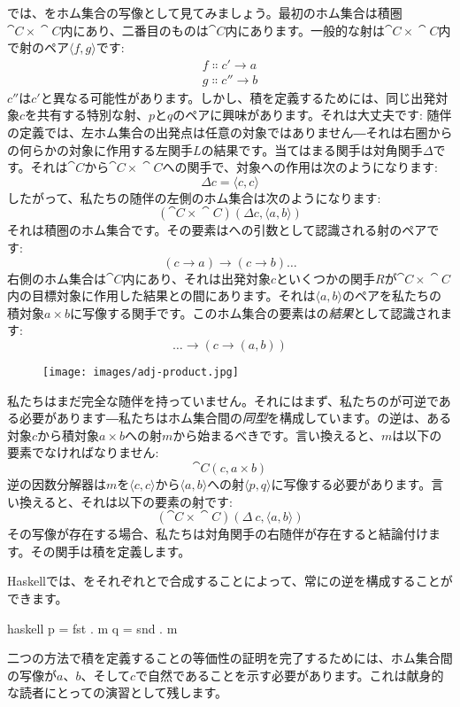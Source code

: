 では、をホム集合の写像として見てみましょう。最初のホム集合は積圏$\cat{C}\times{}\cat{C}$内にあり、二番目のものは$\cat{C}$内にあります。一般的な射は$\cat{C}\times{}\cat{C}$内で射のペア$\langle f, g \rangle$です: 
\begin{gather*}
  f \Colon c' \to a \\
  g \Colon c'' \to b
\end{gather*}
$c''$は$c'$と異なる可能性があります。しかし、積を定義するためには、同じ出発対象$c$を共有する特別な射、$p$と$q$のペアに興味があります。それは大丈夫です: 随伴の定義では、左ホム集合の出発点は任意の対象ではありません―それは右圏からの何らかの対象に作用する左関手$L$の結果です。当てはまる関手は対角関手$\Delta$です。それは$\cat{C}$から$\cat{C}\times{}\cat{C}$への関手で、対象への作用は次のようになります: 
\[\Delta c = \langle c, c \rangle\]
したがって、私たちの随伴の左側のホム集合は次のようになります: 
\[(\cat{C}\times{}\cat{C})(\Delta c, \langle a, b \rangle)\]
それは積圏のホム集合です。その要素はへの引数として認識される射のペアです: 
\[(c \to a) \to (c \to b) \ldots{}\]
右側のホム集合は$\cat{C}$内にあり、それは出発対象$c$といくつかの関手$R$が$\cat{C}\times{}\cat{C}$内の目標対象に作用した結果との間にあります。それは$\langle a, b \rangle$のペアを私たちの積対象$a\times{}b$に写像する関手です。このホム集合の要素はの\emph{結果}として認識されます: 
\[\ldots{} \to (c \to (a, b))\]

\begin{figure}[H]
  \centering
  \texttt{[image: images/adj-product.jpg]}
\end{figure}

\noindent
私たちはまだ完全な随伴を持っていません。それにはまず、私たちのが可逆である必要があります―私たちはホム集合間の\emph{同型}を構成しています。の逆は、ある対象$c$から積対象$a\times{}b$への射$m$から始まるべきです。言い換えると、$m$は以下の要素でなければなりません: 
\[\cat{C}(c, a\times{}b)\]
逆の因数分解器は$m$を$\langle c, c \rangle$から$\langle a, b \rangle$への射$\langle p, q \rangle$に写像する必要があります。言い換えると、それは以下の要素の射です: 
\[(\cat{C}\times{}\cat{C})(\Delta\ c, \langle a, b \rangle)\]
その写像が存在する場合、私たちは対角関手の右随伴が存在すると結論付けます。その関手は積を定義します。

Haskellでは、をそれぞれとで合成することによって、常にの逆を構成することができます。

\begin{snip}{haskell}
p = fst . m
q = snd . m
\end{snip}
二つの方法で積を定義することの等価性の証明を完了するためには、ホム集合間の写像が$a$、$b$、そして$c$で自然であることを示す必要があります。これは献身的な読者にとっての演習として残します。

